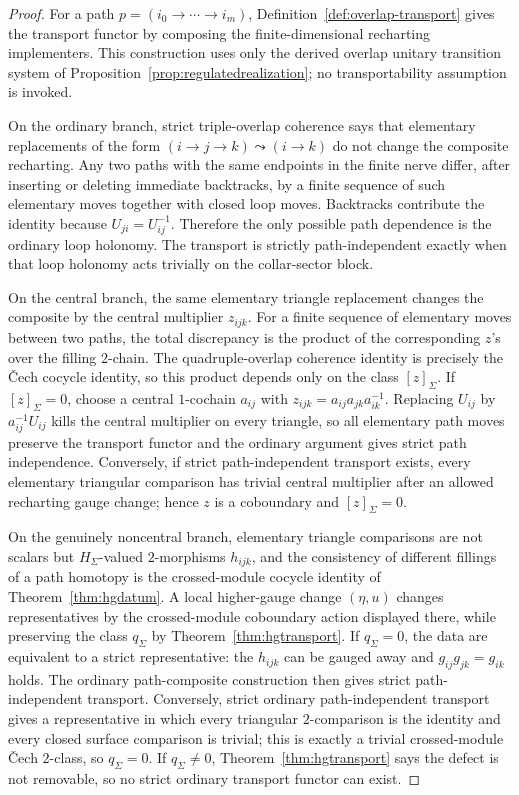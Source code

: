 \documentclass[11pt]{article}
\begin{document}
\begin{proof}
For a path \(p=(i_0\to\cdots\to i_m)\), Definition~\ref{def:overlap-transport} gives the
transport functor by composing the finite-dimensional recharting implementers. This construction
uses only the derived overlap unitary transition system of
Proposition~\ref{prop:regulatedrealization}; no transportability assumption is invoked.

On the ordinary branch, strict triple-overlap coherence says that elementary replacements of the
form \((i\to j\to k)\leadsto(i\to k)\) do not change the composite recharting. Any two paths with
the same endpoints in the finite nerve differ, after inserting or deleting immediate backtracks,
by a finite sequence of such elementary moves together with closed loop moves. Backtracks
contribute the identity because \(U_{ji}=U_{ij}^{-1}\). Therefore the only possible path
dependence is the ordinary loop holonomy. The transport is strictly path-independent exactly when
that loop holonomy acts trivially on the collar-sector block.

On the central branch, the same elementary triangle replacement changes the composite by the
central multiplier \(z_{ijk}\). For a finite sequence of elementary moves between two paths, the
total discrepancy is the product of the corresponding \(z\)'s over the filling \(2\)-chain. The
quadruple-overlap coherence identity is precisely the \v{C}ech cocycle identity, so this product
depends only on the class \([z]_\Sigma\). If \([z]_\Sigma=0\), choose a central \(1\)-cochain
\(a_{ij}\) with \(z_{ijk}=a_{ij}a_{jk}a_{ik}^{-1}\). Replacing \(U_{ij}\) by \(a_{ij}^{-1}U_{ij}\)
kills the central multiplier on every triangle, so all elementary path moves preserve the
transport functor and the ordinary argument gives strict path independence. Conversely, if strict
path-independent transport exists, every elementary triangular comparison has trivial central
multiplier after an allowed recharting gauge change; hence \(z\) is a coboundary and
\([z]_\Sigma=0\).

On the genuinely noncentral branch, elementary triangle comparisons are not scalars but
\(H_\Sigma\)-valued \(2\)-morphisms \(h_{ijk}\), and the consistency of different fillings of a
path homotopy is the crossed-module cocycle identity of Theorem~\ref{thm:hgdatum}. A local
higher-gauge change \((\eta,u)\) changes representatives by the crossed-module coboundary action
displayed there, while preserving the class \(q_\Sigma\) by Theorem~\ref{thm:hgtransport}. If
\(q_\Sigma=0\), the data are equivalent to a strict representative: the \(h_{ijk}\) can be gauged
away and \(g_{ij}g_{jk}=g_{ik}\) holds. The ordinary path-composite construction then gives
strict path-independent transport. Conversely, strict ordinary path-independent transport gives a
representative in which every triangular \(2\)-comparison is the identity and every closed surface
comparison is trivial; this is exactly a trivial crossed-module \v{C}ech \(2\)-class, so
\(q_\Sigma=0\). If \(q_\Sigma\ne0\), Theorem~\ref{thm:hgtransport} says the defect is not
removable, so no strict ordinary transport functor can exist.
\end{proof}
\end{document}
